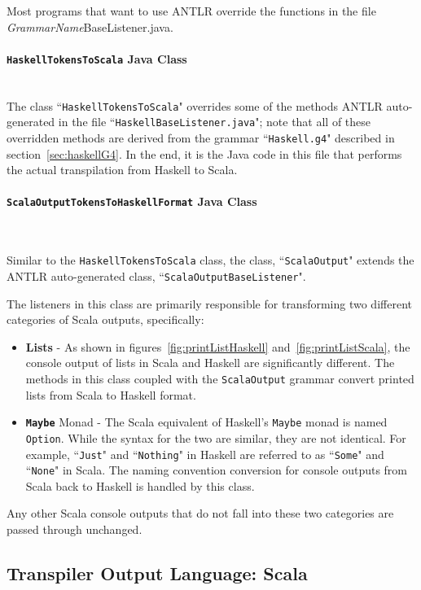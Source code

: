 \documentclass{report}
\newcommand{\myparagraph}[1]{\paragraph{#1}\mbox{}\\}
\begin{document}
Most programs that want to use ANTLR override the functions in the file \emph{GrammarName}BaseListener.java.


\myparagraph{\texttt{HaskellTokensToScala} Java Class}

The class ``\texttt{HaskellTokensToScala}" overrides some of the methods ANTLR auto-generated in the file ``\texttt{HaskellBaseListener.java}"; note that all of these overridden methods are derived from the grammar ``\texttt{Haskell.g4}" described in section~\ref{sec:haskellG4}.  In the end, it is the Java code in this file that performs the actual transpilation from Haskell to Scala.

\myparagraph{\texttt{ScalaOutputTokensToHaskellFormat} Java Class}\label{sec:scalaOutputFunctionality}

Similar to the \texttt{HaskellTokensToScala} class, the class, ``\texttt{ScalaOutput}" extends the ANTLR auto-generated class, ``\texttt{ScalaOutputBaseListener}".

The listeners in this class are primarily responsible for transforming two different categories of Scala outputs, specifically:

\begin{itemize}

\item \textbf{Lists} - As shown in figures~\ref{fig:printListHaskell} and~\ref{fig:printListScala}, the console output of lists in Scala and Haskell are significantly different.  The methods in this class coupled with the \texttt{ScalaOutput} grammar convert printed lists from Scala to Haskell format.

\item \textbf{\texttt{Maybe}} Monad - The Scala equivalent of Haskell's \texttt{Maybe} monad is named \texttt{Option}.  While the syntax for the two are similar, they are not identical.  For example, ``\texttt{Just}" and ``\texttt{Nothing}" in Haskell are referred to as ``\texttt{Some}" and ``\texttt{None}" in Scala.  The naming convention conversion for console outputs from Scala back to Haskell is handled by this class.

\end{itemize}

Any other Scala console outputs that do not fall into these two categories are passed through unchanged.


\subsection{Transpiler Output Language: Scala}
\end{document}
